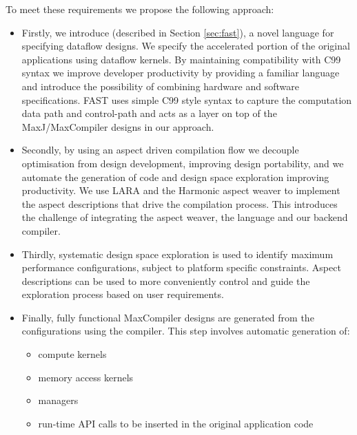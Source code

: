 To meet these requirements we propose the following approach:
\begin{itemize}
\item Firstly, we introduce \FAST{} (described in Section
  \ref{sec:fast}), a novel language for specifying dataflow
  designs. We specify the accelerated portion of the original
  applications using \FAST{} dataflow kernels. By maintaining
  compatibility with C99 syntax we improve developer productivity by
  providing a familiar language and introduce the possibility of
  combining hardware and software specifications.  FAST uses simple
  C99 style syntax to capture the computation data path and
  control-path and acts as a layer on top of the MaxJ/MaxCompiler
  designs in our approach.

\item Secondly, by using an aspect driven compilation flow we decouple
  optimisation from design development, improving design portability,
  and we automate the generation of code and design space exploration
  improving productivity. We use LARA and the Harmonic aspect weaver
  to implement the aspect descriptions that drive the compilation
  process. This introduces the challenge of integrating the aspect
  weaver, the \FAST{} language and our backend \fastc{} compiler.

\item Thirdly, systematic design space exploration is used to identify
  maximum performance configurations, subject to platform specific
  constraints. Aspect descriptions can be used to more conveniently
  control and guide the exploration process based on user
  requirements.

\item Finally, fully functional MaxCompiler designs are generated from
  the configurations using the \fastc{} compiler. This step involves
  automatic generation of:
\begin{itemize}
\item compute kernels
\item memory access kernels
\item managers
\item run-time API calls to be inserted in the original application code
\end{itemize}
\end{itemize}

